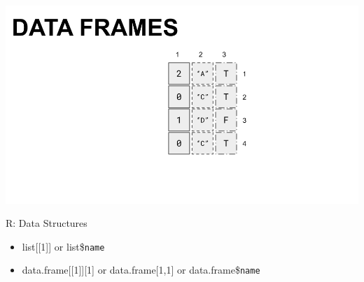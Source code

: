 \documentclass[
  ignorenonframetext,
]{beamer}
\providecommand{\tightlist}{%
  \setlength{\itemsep}{0pt}\setlength{\parskip}{0pt}}
\begin{document}
\begin{frame}

\includegraphics{../external/images/DF.png}

\end{frame}

\begin{frame}[fragile]{R: Data Structures}
\protect\hypertarget{r-data-structures-2}{}

\begin{itemize}[<+->]
\tightlist
\item
  list{[}{[}1{]}{]} or list\$\texttt{name}
\item
  data.frame{[}{[}1{]}{]}{[}1{]} or data.frame{[}1,1{]} or
  data.frame\$\texttt{name}
\end{itemize}

\end{frame}
\end{document}
